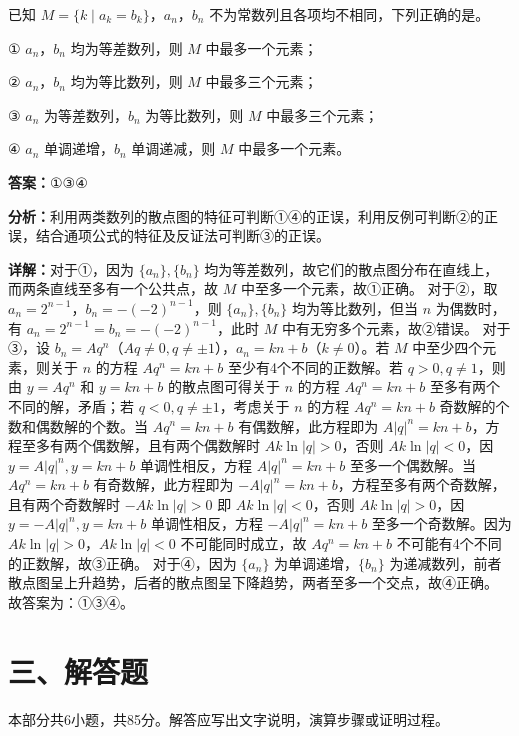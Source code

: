 \begin{question}[points=5]
已知 $M = \{k \mid a_k = b_k\}$，$a_n$，$b_n$ 不为常数列且各项均不相同，下列正确的是。

① $a_n$，$b_n$ 均为等差数列，则 $M$ 中最多一个元素；

② $a_n$，$b_n$ 均为等比数列，则 $M$ 中最多三个元素；

③ $a_n$ 为等差数列，$b_n$ 为等比数列，则 $M$ 中最多三个元素；

④ $a_n$ 单调递增，$b_n$ 单调递减，则 $M$ 中最多一个元素。
\fillin[{$①③④$}]
\begin{solution}
\textbf{答案：}$①③④$

\textbf{分析：}利用两类数列的散点图的特征可判断①④的正误，利用反例可判断②的正误，结合通项公式的特征及反证法可判断③的正误。

\textbf{详解：}对于①，因为 $\{a_n\}, \{b_n\}$ 均为等差数列，故它们的散点图分布在直线上，而两条直线至多有一个公共点，故 $M$ 中至多一个元素，故①正确。
对于②，取 $a_n = 2^{n-1}$，$b_n = -(-2)^{n-1}$，则 $\{a_n\}, \{b_n\}$ 均为等比数列，但当 $n$ 为偶数时，有 $a_n = 2^{n-1} = b_n = -(-2)^{n-1}$，此时 $M$ 中有无穷多个元素，故②错误。
对于③，设 $b_n = Aq^n$（$Aq \neq 0, q \neq \pm 1$），$a_n = kn + b$（$k \neq 0$）。若 $M$ 中至少四个元素，则关于 $n$ 的方程 $Aq^n = kn + b$ 至少有4个不同的正数解。若 $q>0, q\neq 1$，则由 $y=Aq^n$ 和 $y=kn+b$ 的散点图可得关于 $n$ 的方程 $Aq^n = kn+b$ 至多有两个不同的解，矛盾；若 $q<0, q\neq \pm 1$，考虑关于 $n$ 的方程 $Aq^n = kn+b$ 奇数解的个数和偶数解的个数。当 $Aq^n = kn+b$ 有偶数解，此方程即为 $A|q|^n = kn+b$，方程至多有两个偶数解，且有两个偶数解时 $Ak\ln|q|>0$，否则 $Ak\ln|q|<0$，因 $y=A|q|^n, y=kn+b$ 单调性相反，方程 $A|q|^n = kn+b$ 至多一个偶数解。当 $Aq^n = kn+b$ 有奇数解，此方程即为 $-A|q|^n = kn+b$，方程至多有两个奇数解，且有两个奇数解时 $-Ak\ln|q|>0$ 即 $Ak\ln|q|<0$，否则 $Ak\ln|q|>0$，因 $y=-A|q|^n, y=kn+b$ 单调性相反，方程 $-A|q|^n = kn+b$ 至多一个奇数解。因为 $Ak\ln|q|>0$，$Ak\ln|q|<0$ 不可能同时成立，故 $Aq^n = kn+b$ 不可能有4个不同的正数解，故③正确。
对于④，因为 $\{a_n\}$ 为单调递增，$\{b_n\}$ 为递减数列，前者散点图呈上升趋势，后者的散点图呈下降趋势，两者至多一个交点，故④正确。
故答案为：①③④。
\end{solution}
\end{question}

\section*{三、解答题}
本部分共6小题，共85分。解答应写出文字说明，演算步骤或证明过程。


